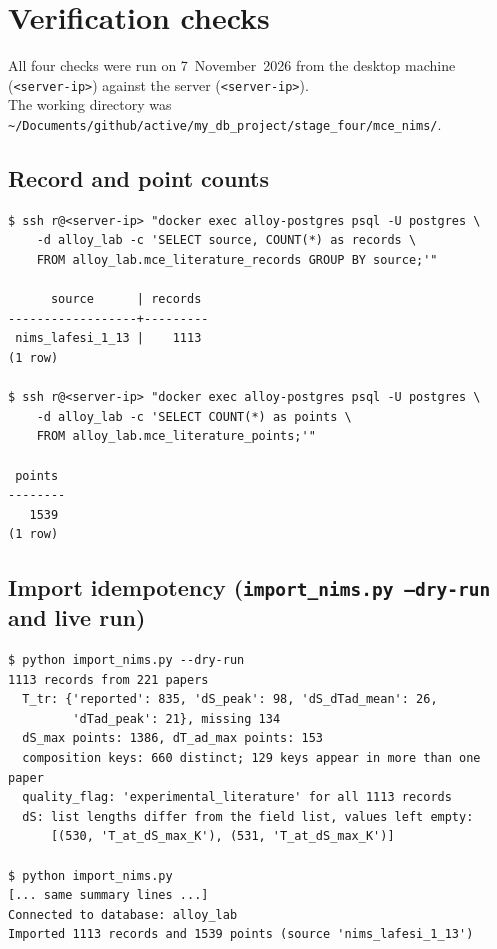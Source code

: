 \documentclass[11pt,a4paper]{article}
\begin{document}
\newpage
\section{Verification checks}
\label{sec:checks}

All four checks were run on 7~November~2026 from the desktop machine
(\texttt{<server-ip>}) against the server (\texttt{<server-ip>}).\\

The working directory was
\texttt{\textasciitilde/Documents/github/active/my\_db\_project/stage\_four/mce\_nims/}.

\subsection{Record and point counts}

\begin{lstlisting}[style=terminal, caption={Database record counts.}]
$ ssh r@<server-ip> "docker exec alloy-postgres psql -U postgres \
    -d alloy_lab -c 'SELECT source, COUNT(*) as records \
    FROM alloy_lab.mce_literature_records GROUP BY source;'"

      source      | records
------------------+---------
 nims_lafesi_1_13 |    1113
(1 row)

$ ssh r@<server-ip> "docker exec alloy-postgres psql -U postgres \
    -d alloy_lab -c 'SELECT COUNT(*) as points \
    FROM alloy_lab.mce_literature_points;'"

 points
--------
   1539
(1 row)
\end{lstlisting}

\newpage

\subsection{Import idempotency (\texttt{import\_nims.py --dry-run} and live run)}

\begin{lstlisting}[style=terminal, caption={Dry-run and live import confirming idempotency.}]
$ python import_nims.py --dry-run
1113 records from 221 papers
  T_tr: {'reported': 835, 'dS_peak': 98, 'dS_dTad_mean': 26,
         'dTad_peak': 21}, missing 134
  dS_max points: 1386, dT_ad_max points: 153
  composition keys: 660 distinct; 129 keys appear in more than one paper
  quality_flag: 'experimental_literature' for all 1113 records
  dS: list lengths differ from the field list, values left empty:
      [(530, 'T_at_dS_max_K'), (531, 'T_at_dS_max_K')]

$ python import_nims.py
[... same summary lines ...]
Connected to database: alloy_lab
Imported 1113 records and 1539 points (source 'nims_lafesi_1_13')
\end{lstlisting}
\end{document}
